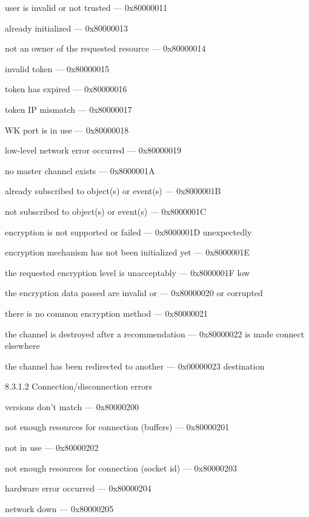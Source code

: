 \documentclass[titlepage,oneside]{book}
\begin{document}
user is invalid or not trusted                    --- 0x80000011

already initialized                               --- 0x80000013

not an owner of the requested resource            --- 0x80000014

invalid token                                     --- 0x80000015

token has expired                                 --- 0x80000016

token IP mismatch                                 --- 0x80000017

WK port is in use                                 --- 0x80000018

low-level network error occurred                  --- 0x80000019

no master channel exists                          --- 0x8000001A

already subscribed to object(s) or event(s)       --- 0x8000001B

not subscribed to object(s) or event(s)           --- 0x8000001C

encryption is not supported or failed             --- 0x8000001D
unexpectedly

encryption mechanism has not been initialized yet --- 0x8000001E

the requested encryption level is unacceptably    --- 0x8000001F
low

the encryption data passed are invalid or         --- 0x80000020
or corrupted

there is no common encryption method              --- 0x80000021

the channel is destroyed after a recommendation   --- 0x80000022
is made connect elsewhere

the channel has been redirected to another        --- 0x00000023
destination

8.3.1.2 Connection/disconnection errors

versions don't match                              --- 0x80000200

not enough resources for connection (buffers)     --- 0x80000201

not in use                                        --- 0x80000202

not enough resources for connection (socket id)   --- 0x80000203

hardware error occurred                           --- 0x80000204

network down                                      --- 0x80000205
\end{document}
